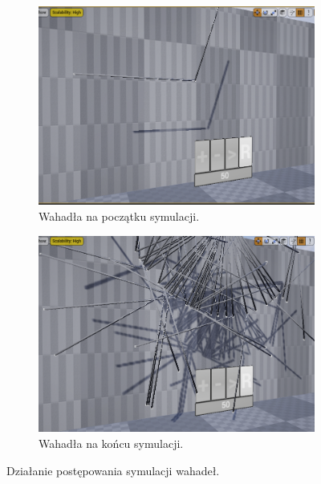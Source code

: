 \documentclass[a4paper,12pt,reqno]{article}
\begin{document}
\begin{figure}[!ht]%
	\centering
	\begin{subfigure}{.5\textwidth}
		\centering
		\includegraphics[width=.95\linewidth]{graphics/pendulum/PendulumInUE_1.png}
		\caption{Wahadła na początku symulacji.}	
		\label{Pendulum_in_project:subref_a}
	\end{subfigure}%
	\hfill
	\begin{subfigure}{.5\textwidth}
		\centering
		\includegraphics[width=.95\linewidth]{graphics/pendulum/PendulumInUE_2.png}
		\caption{Wahadła na końcu symulacji.}
		\label{Pendulum_in_project:subref_b}
	\end{subfigure}%
	

\caption{Działanie postępowania symulacji wahadeł.}
\label{Pendulum_in_project}
\end{figure}
\end{document}
